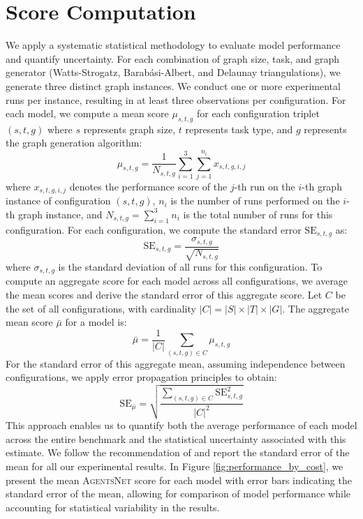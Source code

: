 \documentclass{article}
\newcommand{\benchmark}{\textsc{AgentsNet}}
\begin{document}
\section{Score Computation}\label{app:score_computation}
We apply a systematic statistical methodology to evaluate model performance and quantify uncertainty. For each combination of graph size, task, and graph generator (Watts-Strogatz, Barabási-Albert, and Delaunay triangulations), we generate three distinct graph instances. We conduct one or more experimental runs per instance, resulting in at least three observations per configuration.
For each model, we compute a mean score $\mu_{s,t,g}$ for each configuration triplet $(s, t, g)$ where $s$ represents graph size, $t$ represents task type, and $g$ represents the graph generation algorithm:
\begin{equation}
\mu_{s,t,g} = \frac{1}{N_{s,t,g}} \sum_{i=1}^{3}\sum_{j=1}^{n_{i}} x_{s,t,g,i,j}
\end{equation}
where $x_{s,t,g,i,j}$ denotes the performance score of the $j$-th run on the $i$-th graph instance of configuration $(s, t, g)$, $n_{i}$ is the number of runs performed on the $i$-th graph instance, and $N_{s,t,g} = \sum_{i=1}^{3} n_{i}$ is the total number of runs for this configuration.
For each configuration, we compute the standard error $\text{SE}_{s,t,g}$ as:
\begin{equation}
\text{SE}_{s,t,g} = \frac{\sigma_{s,t,g}}{\sqrt{N_{s,t,g}}}
\end{equation}
where $\sigma_{s,t,g}$ is the standard deviation of all runs for this configuration.
To compute an aggregate score for each model across all configurations, we average the mean scores and derive the standard error of this aggregate score. Let $C$ be the set of all configurations, with cardinality $|C| = |S| \times |T| \times |G|$. The aggregate mean score $\bar{\mu}$ for a model is:
\begin{equation}
\bar{\mu} = \frac{1}{|C|} \sum_{(s,t,g) \in C} \mu_{s,t,g}
\end{equation}
For the standard error of this aggregate mean, assuming independence between configurations, we apply error propagation principles to obtain:
\begin{equation}
\text{SE}_{\bar{\mu}} = \sqrt{\frac{\sum_{(s,t,g) \in C} \text{SE}_{s,t,g}^{2}}{|C|^{2}}}
\end{equation}
This approach enables us to quantify both the average performance of each model across the entire benchmark and the statistical uncertainty associated with this estimate. We follow the recommendation of \citet{miller2024adding} and report the standard error of the mean for all our experimental results. In Figure \ref{fig:performance_by_cost}, we present the mean \benchmark{} score for each model with error bars indicating the standard error of the mean, allowing for comparison of model performance while accounting for statistical variability in the results.
\end{document}
